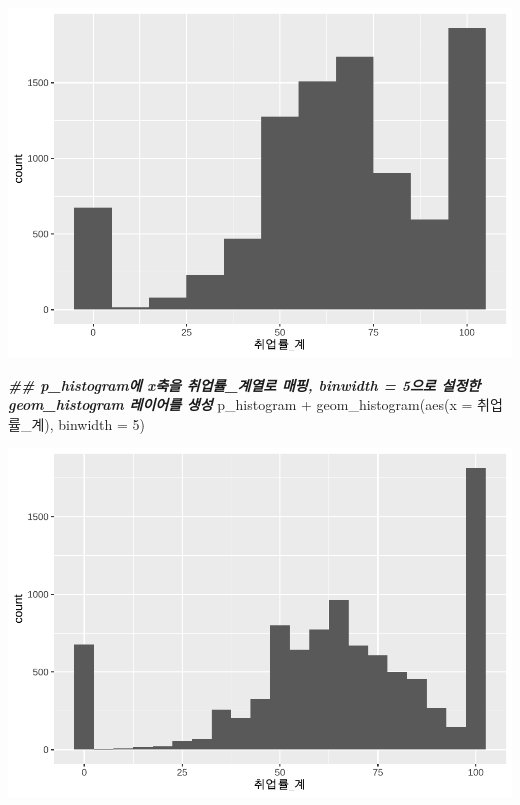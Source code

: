 \documentclass[
]{article}
\newenvironment{Shaded}{\begin{snugshade}}{\end{snugshade}}
\newcommand{\AttributeTok}[1]{\textcolor[rgb]{0.77,0.63,0.00}{#1}}
\newcommand{\DecValTok}[1]{\textcolor[rgb]{0.00,0.00,0.81}{#1}}
\newcommand{\DocumentationTok}[1]{\textcolor[rgb]{0.56,0.35,0.01}{\textbf{\textit{#1}}}}
\newcommand{\FunctionTok}[1]{\textcolor[rgb]{0.00,0.00,0.00}{#1}}
\newcommand{\NormalTok}[1]{#1}
\newcommand{\SpecialCharTok}[1]{\textcolor[rgb]{0.00,0.00,0.00}{#1}}
\begin{document}
\includegraphics{chap3_files/figure-latex/unnamed-chunk-20-3.pdf}

\begin{Shaded}
\begin{Highlighting}[]
\DocumentationTok{\#\# p\_histogram에 x축을 \textquotesingle{}취업률\_계\textquotesingle{}열로 매핑, binwidth = 5으로 설정한 geom\_histogram 레이어를 생성 }
\NormalTok{p\_histogram }\SpecialCharTok{+}
  \FunctionTok{geom\_histogram}\NormalTok{(}\FunctionTok{aes}\NormalTok{(}\AttributeTok{x =}\NormalTok{ 취업률\_계), }\AttributeTok{binwidth =} \DecValTok{5}\NormalTok{)}
\end{Highlighting}
\end{Shaded}

\includegraphics{chap3_files/figure-latex/unnamed-chunk-20-4.pdf}
\end{document}
